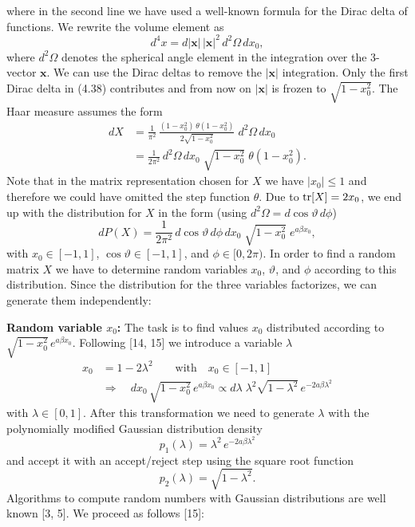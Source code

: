 where in the second line we have used a well-known formula for the Dirac
delta of functions. We rewrite the volume element as
\begin{equation}
  d^4x = d|\mathbf{x}|\,|\mathbf{x}|^2\,d^2\Omega\,dx_0,
\end{equation}
where $d^2\Omega$ denotes the spherical angle element in the integration over the
3-vector $\mathbf{x}$. We can use the Dirac deltas to remove the $|\mathbf{x}|$ integration. Only
the first Dirac delta in (4.38) contributes and from now on $|\mathbf{x}|$ is frozen to
$\sqrt{1-x_0^2}$. The Haar measure assumes the form
\begin{equation}
  \begin{split}
    dX &= \frac{1}{\pi^2}\,\frac{(1-x_0^2)\,\theta(1-x_0^2)}{2\sqrt{1-x_0^2}}\;d^2\Omega\,dx_0 \\
    &= \frac{1}{2\pi^2}\,d^2\Omega\,dx_0\;\sqrt{1-x_0^2}\;\theta(1-x_0^2).
  \end{split}
\end{equation}
Note that in the matrix representation chosen for $X$ we have $|x_0| \leq 1$ and
therefore we could have omitted the step function $\theta$. Due to $\operatorname{tr}[X] = 2x_0$, we
end up with the distribution for $X$ in the form (using $d^2\Omega = d\cos\vartheta\,d\phi$)
\begin{equation}
  dP(X) = \frac{1}{2\pi^2}\,d\cos\vartheta\,d\phi\,dx_0\;\sqrt{1-x_0^2}\;e^{a\beta x_0},
\end{equation}
with $x_0 \in [-1,1]$, $\cos\vartheta \in [-1,1]$, and $\phi \in [0,2\pi)$. In order to find a random
matrix $X$ we have to determine random variables $x_0$, $\vartheta$, and $\phi$ according to
this distribution. Since the distribution for the three variables factorizes, we
can generate them independently:

\textbf{Random variable $x_0$:} The task is to find values $x_0$ distributed according to
$\sqrt{1-x_0^2}\,e^{a\beta x_0}$. Following [14, 15] we introduce a variable $\lambda$
\begin{equation}
  \begin{split}
    x_0 &= 1 - 2\lambda^2 \qquad \text{with}\quad x_0 \in [-1,1] \\
    &\Rightarrow\quad dx_0\,\sqrt{1-x_0^2}\,e^{a\beta x_0}
    \propto d\lambda\;\lambda^2\sqrt{1-\lambda^2}\,e^{-2a\beta\lambda^2}
  \end{split}
\end{equation}
with $\lambda \in [0,1]$. After this transformation we need to generate $\lambda$ with the polynomially
modified Gaussian distribution density
\begin{equation}
  p_1(\lambda) = \lambda^2\,e^{-2a\beta\lambda^2}
\end{equation}
and accept it with an accept/reject step using the square root function
\begin{equation}
  p_2(\lambda) = \sqrt{1-\lambda^2}.
\end{equation}
Algorithms to compute random numbers with Gaussian distributions are
well known [3, 5]. We proceed as follows [15]:

